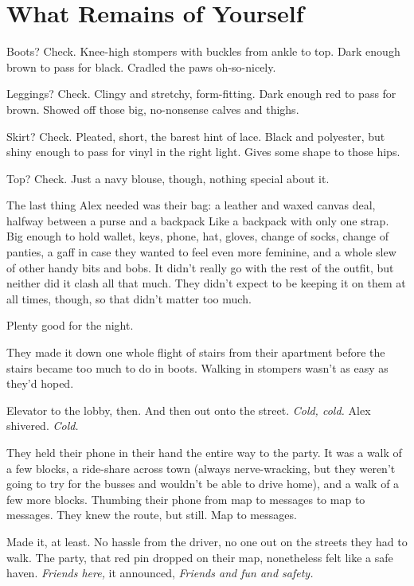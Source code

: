 \hypertarget{what-remains-of-yourself}{%
\chapter{What Remains of Yourself}\label{what-remains-of-yourself}}

Boots? Check. Knee-high stompers with buckles from ankle to top. Dark enough brown to pass for black. Cradled the paws oh-so-nicely.

Leggings? Check. Clingy and stretchy, form-fitting. Dark enough red to pass for brown. Showed off those big, no-nonsense calves and thighs.

Skirt? Check. Pleated, short, the barest hint of lace. Black and polyester, but shiny enough to pass for vinyl in the right light. Gives some shape to those hips.

Top? Check. Just a navy blouse, though, nothing special about it.

The last thing Alex needed was their bag: a leather and waxed canvas deal, halfway between a purse and a backpack Like a backpack with only one strap. Big enough to hold wallet, keys, phone, hat, gloves, change of socks, change of panties, a gaff in case they wanted to feel even more feminine, and a whole slew of other handy bits and bobs. It didn't really go with the rest of the outfit, but neither did it clash all that much. They didn't expect to be keeping it on them at all times, though, so that didn't matter too much.

Plenty good for the night.

They made it down one whole flight of stairs from their apartment before the stairs became too much to do in boots. Walking in stompers wasn't as easy as they'd hoped.

Elevator to the lobby, then. And then out onto the street. \emph{Cold, cold.} Alex shivered. \emph{Cold.}

They held their phone in their hand the entire way to the party. It was a walk of a few blocks, a ride-share across town (always nerve-wracking, but they weren't going to try for the busses and wouldn't be able to drive home), and a walk of a few more blocks. Thumbing their phone from map to messages to map to messages. They knew the route, but still. Map to messages.

Made it, at least. No hassle from the driver, no one out on the streets they had to walk. The party, that red pin dropped on their map, nonetheless felt like a safe haven. \emph{Friends here,} it announced, \emph{Friends and fun and safety.}

